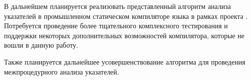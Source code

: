 \documentclass[14pt,titlepage,draft]{extarticle}
\newcommand{\java}{\eng{Java}\xspace}
\begin{document}

    В дальнейшем планируется реализовать представленный алгоритм анализа
    указателей в промышленном статическом компиляторе языка \java в
    рамках проекта . Потребуется проведение более
    тщательного комплексного тестирования и поддержки некоторых дополнительных
    возможностей компилятора, которые не вошли в данную работу.

    Также планируется дальнейшее усовершенствование алгоритма для
    проведения межпроцедурного анализа указателей.

  
  
\end{document}
